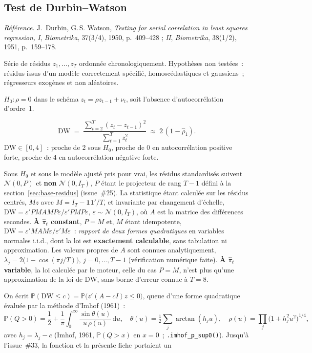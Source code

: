 \documentclass[a4paper,11pt]{article}
\newcommand{\code}[1]{\texttt{\small #1}}
\newcommand{\refl}[1]{{\small\textcolor{maincolor!70!black}{\textit{Référence.} #1}}\par\smallskip}
\newcounter{ficheid}
\newenvironment{fiche}[1]{%
  \stepcounter{ficheid}%
  \phantomsection
  \subsection{#1}%
  \label{fiche:\theficheid}%
}{%
  \end{description}\vspace{0.5em}%
}
\newcommand{\Cadre}{%
  \begin{description}[leftmargin=0pt, style=unboxed, itemsep=3pt, topsep=3pt, parsep=2pt]%
  \item[\textcolor{financeblue}{\textbf{1. Cadre, notations et hypothèses de validité (non testées).}}]}
\newcommand{\Hzero}{\item[\textcolor{financeblue}{\textbf{2. Hypothèse nulle.}}]}
\newcommand{\Stat}{\item[\textcolor{financeblue}{\textbf{3. Statistique de test.}}]}
\newcommand{\Loi}{\item[\textcolor{financeblue}{\textbf{4. Loi sous $H_0$.}}]}
\newcommand{\Pval}{\item[\textcolor{financeblue}{\textbf{5. p-value.}}]}
\begin{document}
\begin{fiche}{Test de Durbin--Watson}
\label{fiche:durbin-watson}%
\refl{J.~Durbin, G.\,S. Watson, \emph{Testing for serial correlation in least squares regression,
I}, \emph{Biometrika}, 37(3/4), 1950, p.~409--428 ; \emph{II}, \emph{Biometrika}, 38(1/2), 1951,
p.~159--178.}
\Cadre
Série de résidus $z_1,\dots,z_T$ ordonnée chronologiquement. Hypothèses non testées~: résidus
issus d'un modèle correctement spécifié, homoscédastiques et gaussiens~; régresseurs exogènes et
non aléatoires.
\Hzero
$H_0 : \rho = 0$ dans le schéma $z_t = \rho z_{t-1} + \nu_t$, soit l'absence d'autocorrélation
d'ordre~1.
\Stat
\[
  \mathrm{DW} \;=\; \frac{\sum_{t=2}^{T}(z_t - z_{t-1})^2}{\sum_{t=1}^{T} z_t^2}
  \;\approx\; 2\,(1 - \hat\rho_1).
\]
$\mathrm{DW} \in [0,4]$~: proche de 2 sous $H_0$, proche de 0 en autocorrélation positive forte,
proche de 4 en autocorrélation négative forte.
\Loi
Sous $H_0$ et sous le modèle ajusté pris pour vrai, les résidus standardisés suivent
$\mathcal{N}(0, P)$ et \textbf{non} $\mathcal{N}(0, I_T)$, $P$ étant le projecteur de rang $T-1$
défini à la section~\ref{sec:base-residus} (issue~\#25). La statistique étant calculée sur les
résidus centrés, $Mz$ avec $M = I_T - \mathbf{1}\mathbf{1}'/T$, et invariante par changement
d'échelle, $\mathrm{DW} = \varepsilon' P M A M P \varepsilon \big/ \varepsilon' P M P
\varepsilon$, $\varepsilon \sim \mathcal{N}(0, I_T)$, où $A$ est la matrice des différences
secondes. \textbf{À $\hat\pi_t$ constant}, $P = M$ et, $M$ étant idempotente,
$\mathrm{DW} = \varepsilon' M A M \varepsilon / \varepsilon' M \varepsilon$~: \emph{rapport de
deux formes quadratiques} en variables normales i.i.d., dont la loi est \textbf{exactement
calculable}, sans tabulation ni approximation. Les valeurs propres de $A$ sont connues
analytiquement, $\lambda_j = 2\big(1 - \cos(\pi j / T)\big)$, $j = 0,\dots,T-1$ (vérification
numérique faite). \textbf{À $\hat\pi_t$ variable}, la loi calculée par le moteur, celle du cas
$P = M$, n'est plus qu'une approximation de la loi de $\mathrm{DW}$, sans borne d'erreur connue
à $T = 8$.
\Pval
On écrit $\mathbb{P}(\mathrm{DW} \le c) = \mathbb{P}\big(z'(A - cI)z \le 0\big)$, queue d'une
forme quadratique évaluée par la méthode d'Imhof (1961)~:
\[
  \mathbb{P}(Q > 0) = \frac{1}{2} + \frac{1}{\pi}\int_0^{\infty}
  \frac{\sin\theta(u)}{u\,\rho(u)}\,\mathrm{d}u,
  \quad
  \theta(u) = \tfrac12\sum_j \arctan(h_j u),
  \quad
  \rho(u) = \prod_j \big(1 + h_j^2u^2\big)^{1/4},
\]
avec $h_j = \lambda_j - c$ (Imhof, 1961, $\mathbb{P}(Q > x)$ en $x = 0$~;
\code{.imhof\_p\_sup0()}). Jusqu'à l'issue~\#33, la fonction et la présente fiche portaient un

\end{fiche}
\end{document}
